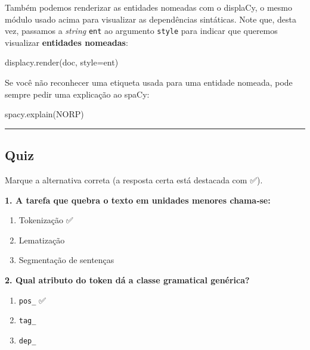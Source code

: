 \documentclass[
  brazilian,
  11pt,
]{article}
\newenvironment{Shaded}{\begin{snugshade}}{\end{snugshade}}
\newcommand{\NormalTok}[1]{\textcolor[rgb]{0.81,0.81,0.76}{#1}}
\newcommand{\OperatorTok}[1]{\textcolor[rgb]{0.81,0.81,0.76}{#1}}
\newcommand{\StringTok}[1]{\textcolor[rgb]{0.96,0.31,0.31}{#1}}
\providecommand{\tightlist}{%
  \setlength{\itemsep}{0pt}\setlength{\parskip}{0pt}}
\let\oldtexttt\texttt
\renewcommand{\texttt}[1]{{\color{inlink}\oldtexttt{#1}}}
\begin{document}
Também podemos renderizar as entidades nomeadas com o displaCy, o mesmo
módulo usado acima para visualizar as dependências sintáticas. Note que,
desta vez, passamos a \emph{string}
\texttt{\textquotesingle{}ent\textquotesingle{}} ao argumento
\texttt{style} para indicar que queremos visualizar \textbf{entidades
nomeadas}:

\begin{Shaded}
\begin{Highlighting}[]
\NormalTok{displacy.render(doc, style}\OperatorTok{=}\StringTok{\textquotesingle{}ent\textquotesingle{}}\NormalTok{)}
\end{Highlighting}
\end{Shaded}

Se você não reconhecer uma etiqueta usada para uma entidade nomeada,
pode sempre pedir uma explicação ao spaCy:

\begin{Shaded}
\begin{Highlighting}[]
\NormalTok{spacy.explain(}\StringTok{\textquotesingle{}NORP\textquotesingle{}}\NormalTok{)}
\end{Highlighting}
\end{Shaded}

\begin{center}\rule{0.5\linewidth}{0.5pt}\end{center}

\subsection{Quiz}\label{quiz}

Marque a alternativa correta (a resposta certa está destacada com ✅).

\textbf{1. A tarefa que quebra o texto em unidades menores chama‑se:}

\begin{enumerate}
\def\labelenumi{\arabic{enumi}.}
\tightlist
\item
  Tokenização ✅
\item
  Lematização
\item
  Segmentação de sentenças
\end{enumerate}

\textbf{2. Qual atributo do token dá a classe gramatical genérica?}

\begin{enumerate}
\def\labelenumi{\arabic{enumi}.}
\tightlist
\item
  \texttt{pos\_} ✅
\item
  \texttt{tag\_}
\item
  \texttt{dep\_}
\end{enumerate}
\end{document}

